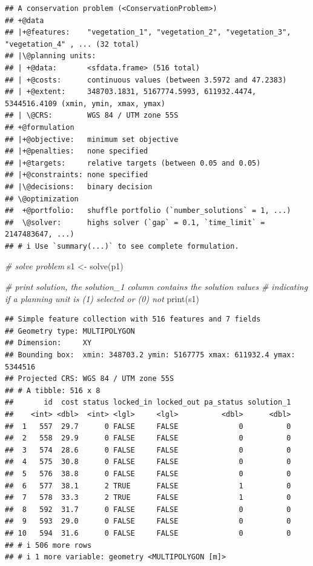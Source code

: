 \documentclass[
  12pt,
]{book}
\newenvironment{Shaded}{\begin{snugshade}}{\end{snugshade}}
\newcommand{\CommentTok}[1]{\textcolor[rgb]{0.56,0.35,0.01}{\textit{#1}}}
\newcommand{\FunctionTok}[1]{\textcolor[rgb]{0.00,0.00,0.00}{#1}}
\newcommand{\NormalTok}[1]{#1}
\newcommand{\OtherTok}[1]{\textcolor[rgb]{0.56,0.35,0.01}{#1}}
\begin{document}
\begin{verbatim}
## A conservation problem (<ConservationProblem>)
## +@data
## |+@features:    "vegetation_1", "vegetation_2", "vegetation_3", "vegetation_4" , ... (32 total)
## |\@planning units:
## | +@data:       <sfdata.frame> (516 total)
## | +@costs:      continuous values (between 3.5972 and 47.2383)
## | +@extent:     348703.1831, 5167774.5993, 611932.4474, 5344516.4109 (xmin, ymin, xmax, ymax)
## | \@CRS:        WGS 84 / UTM zone 55S
## +@formulation
## |+@objective:   minimum set objective
## |+@penalties:   none specified
## |+@targets:     relative targets (between 0.05 and 0.05)
## |+@constraints: none specified
## |\@decisions:   binary decision
## \@optimization
##  +@portfolio:   shuffle portfolio (`number_solutions` = 1, ...)
##  \@solver:      highs solver (`gap` = 0.1, `time_limit` = 2147483647, ...)
## # i Use `summary(...)` to see complete formulation.
\end{verbatim}

\begin{Shaded}
\begin{Highlighting}[]
\CommentTok{\# solve problem}
\NormalTok{s1 }\OtherTok{\textless{}{-}} \FunctionTok{solve}\NormalTok{(p1)}

\CommentTok{\# print solution, the solution\_1 column contains the solution values}
\CommentTok{\# indicating if a planning unit is (1) selected or (0) not}
\FunctionTok{print}\NormalTok{(s1)}
\end{Highlighting}
\end{Shaded}

\begin{verbatim}
## Simple feature collection with 516 features and 7 fields
## Geometry type: MULTIPOLYGON
## Dimension:     XY
## Bounding box:  xmin: 348703.2 ymin: 5167775 xmax: 611932.4 ymax: 5344516
## Projected CRS: WGS 84 / UTM zone 55S
## # A tibble: 516 x 8
##       id  cost status locked_in locked_out pa_status solution_1
##    <int> <dbl>  <int> <lgl>     <lgl>          <dbl>      <dbl>
##  1   557  29.7      0 FALSE     FALSE              0          0
##  2   558  29.9      0 FALSE     FALSE              0          0
##  3   574  28.6      0 FALSE     FALSE              0          0
##  4   575  30.8      0 FALSE     FALSE              0          0
##  5   576  38.8      0 FALSE     FALSE              0          0
##  6   577  38.1      2 TRUE      FALSE              1          0
##  7   578  33.3      2 TRUE      FALSE              1          0
##  8   592  31.7      0 FALSE     FALSE              0          0
##  9   593  29.0      0 FALSE     FALSE              0          0
## 10   594  31.6      0 FALSE     FALSE              0          0
## # i 506 more rows
## # i 1 more variable: geometry <MULTIPOLYGON [m]>
\end{verbatim}
\end{document}
